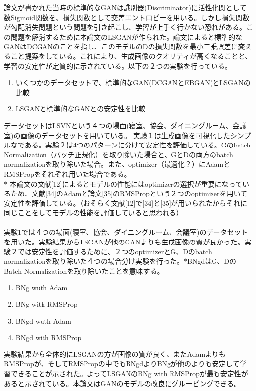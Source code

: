 \documentclass[dvipdfmx]{jsarticle}
\begin{document}
論文が書かれた当時の標準的なGANは識別器(Discriminator)に活性化関として数Sigmoid関数を、損失関数として交差エントロピーを用いる。しかし損失関数が勾配消失問題という問題を引き起こし、学習が上手く行かない恐れがある。この問題を解消するために本論文のLSGANが作られた。論文によると標準的なGANはDCGANのことを指し、このモデルのDの損失関数を最小二乗誤差に変えること提案をしている。これにより、生成画像のクオリティが高くなることと、学習の安定性が定質的に示されている。以下の２つの実験を行っている。
\begin{enumerate}
\item いくつかのデータセットで、標準的なGAN(DCGANとEBGAN)とLSGANの比較
\item LSGANと標準的なGANとの安定性を比較
\end{enumerate}
データセットはLSVNという４つの場面(寝室、協会、ダイニングルーム、会議室)の画像のデータセットを用いている。
実験１は生成画像を可視化したシンプルなである。実験２は4つのパターンに分けて安定性を評価している。Gのbatch Normalization（バッチ正規化）を取り除いた場合と、GとDの両方のbatch normalizationを取り除いた場合。また、optimizer（最適化？）にAdamとRMSPropをそれぞれ用いた場合である。
\\
$\ast$ 本論文の文献[12]によるとモデルの性能にはoptimizerの選択が重要になっているため、文献[34]のAdamと論文[35]のRMSPropという２つのoptimizerを用いて安定性を評価している。（おそらく文献[12]で[34]と[35]が用いられたからそれに同じことをしてモデルの性能を評価していると思われる）
\\\\実験1では４つの場面(寝室、協会、ダイニングルーム、会議室)のデータセットを用いた。実験結果からLSGANが他のGANよりも生成画像の質が良かった。実験２では安定性を評価するために、２つのoptimizerとG、Dのbatch normalizationを取り除いた４つの場合分け実験を行った。$\ast $BNgdはG、DのBatch Normalizationを取り除いたことを意味する。

\begin{enumerate}
\item BNg wuth Adam 
\item BNg with RMSProp 
\item BNgd wuth Adam 
\item BNgd with RMSProp
\end{enumerate}

実験結果から全体的にLSGANの方が画像の質が良く、またAdamよりもRMSPropが、そしてRMSPropの中でもBNgdよりBNgが他のよりも安定して学習できることが示された。よってLSGANのBNg with RMSPropが最も安定性があると示されている。本論文はGANのモデルの改良にグルーピングできる。
\end{document}
